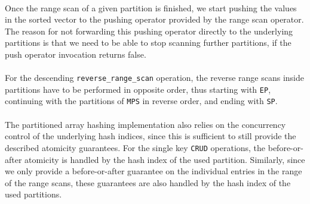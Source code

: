 \documentclass[11pt]{report} %
\begin{document}
\\
Once the range scan of a given partition is finished, we start pushing the values in the sorted vector to the pushing operator provided by the range scan operator. The reason for not forwarding this pushing operator directly to the underlying partitions is that we need to be able to stop scanning further partitions, if the push operator invocation returns false.\\
\\
For the descending \verb|reverse_range_scan| operation, the reverse range scans inside partitions have to be performed in opposite order, thus starting with \verb|EP|, continuing with the partitions of \verb|MPS| in reverse order, and ending with \verb|SP|. \\
\\
The partitioned array hashing implementation also relies on the concurrency control of the underlying hash indices, since this is sufficient to still provide the described atomicity guarantees. For the single key \verb|CRUD| operations, the before-or-after atomicity is handled by the hash index of the used partition. Similarly, since we only provide a before-or-after guarantee on the individual entries in the range of the range scans, these guarantees are also handled by the hash index of the used partitions.
\end{document}
